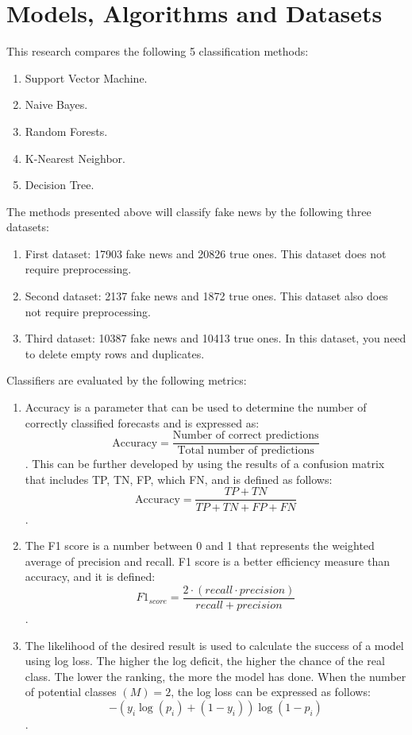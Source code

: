 \newpage
\section{Models, Algorithms and Datasets}\label{sec:mad}

This research compares the following 5 classification methods:
\begin{enumerate}
    \item Support Vector Machine.
    \item Naive Bayes.
    \item Random Forests.
    \item K-Nearest Neighbor.
    \item Decision Tree.
\end{enumerate}

The methods presented above will classify fake news by the following three datasets:
\begin{enumerate}
    \item First dataset: 17903 fake news and 20826 true ones.
    This dataset does not require preprocessing.
    \item Second dataset: 2137 fake news and 1872 true ones.
    This dataset also does not require preprocessing.
    \item Third dataset: 10387 fake news and 10413 true ones.
    In this dataset, you need to delete empty rows and duplicates.
\end{enumerate}

Classifiers are evaluated by the following metrics:
\begin{enumerate}
    \item Accuracy is a parameter that can be used to determine the number of correctly classified forecasts and is expressed as:
    \[\text{Accuracy} =  \frac{\text{Number of correct predictions}}{\text{Total number of predictions}}\].
    This can be further developed by using the results of a confusion matrix that includes TP, TN, FP, which FN, and is defined as follows:
    \[\text{Accuracy} =  \frac{TP + TN}{TP + TN + FP + FN}\].
    \item The F1 score is a number between 0 and 1 that represents the weighted average of precision and recall.
    F1 score is a better efficiency measure than accuracy, and it is defined:
    \[F1_{score} = \frac{2 \cdot (recall \cdot precision)}{recall + precision}\].
    \item The likelihood of the desired result is used to calculate the success of a model using log loss.
    The higher the log deficit, the higher the chance of the real class.
    The lower the ranking, the more the model has done.
    When the number of potential classes $(M) = 2$, the log loss can be expressed as follows:
    \[-(y_{i}\log(p_{i}) + (1 - y_{i}))\log(1 - p_{i})\].
\end{enumerate}
